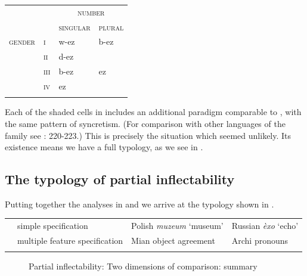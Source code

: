 \documentclass[output=paper]{langscibook}
\begin{document}
\begin{tabularx}{\textwidth}{XXXX}

\lsptoprule
\multicolumn{1}{c}{} &  & \multicolumn{2}{c}{ \textsc{number}}\\
\multicolumn{1}{c}{} &  & \textsc{singular} & \textsc{plural}\\
 \textsc{gender} & \textsc{i} & w-ez & b-ez\\
& \textsc{ii} & d-ez & \\
& \textsc{iii} & b-ez & ez \\
& \textsc{iv} & ez & \\
\lspbottomrule
\end{tabularx}
\begin{table}
\caption{The first singular dative pronoun in Archi}
\label{tab:key:9}
\end{table}

Each of the shaded cells in  includes an additional paradigm comparable to , with the same pattern of syncretism. (For comparison with other languages of the family see \citealt{KibrikKodzasov1990}: 220-223.) This is precisely the situation which seemed unlikely. Its existence means we have a full typology, as we see in .

\subsection{\textbf{The} \textbf{typology} \textbf{of} \textbf{partial} \textbf{inflectability}}

Putting together the analyses in  and  we arrive at the typology shown in . 


\begin{tabularx}{\textwidth}{XXXX}

\lsptoprule
\multicolumn{1}{c}{{ system}

} & simple specification & Polish \textit{muzeum} ‘museum’ & Russian \textit{èxo} ‘echo’\\
& multiple feature specification & Mian object agreement & Archi pronouns\\
\lspbottomrule
\end{tabularx}
\begin{figure}
\caption{Partial inflectability: Two dimensions of comparison: summary}
\label{fig:key:2}
\end{figure}
\end{document}
